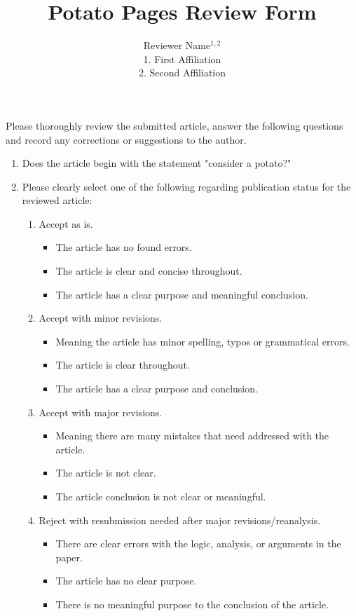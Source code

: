 \documentclass[10pt]{article}
\title{Potato Pages Review Form}
\author{Reviewer Name$^{1,2}$\\ \scriptsize{1. First Affiliation} \\ \scriptsize{2. Second Affiliation}}
\date{}
\begin{document}
\maketitle
\thispagestyle{fancy}

Please thoroughly review the submitted article, answer the following questions and record any corrections or suggestions to the author.

\begin{enumerate}
	\item Does the article begin with the statement "consider a potato?"
	\item Please clearly select one of the following regarding publication status for the reviewed article:
	\begin{enumerate}
		\item Accept as is.
		\begin{itemize}
			\item The article has no found errors.
			\item The article is clear and concise throughout.
			\item The article has a clear purpose and meaningful conclusion.
		\end{itemize}
		\item Accept with minor revisions.
		\begin{itemize}
			\item Meaning the article has minor spelling, typos or grammatical errors.
			\item The article is clear throughout.
			\item The article has a clear purpose and conclusion.
		\end{itemize}
		\item Accept with major revisions.
		\begin{itemize}
			\item Meaning there are many mistakes that need addressed with the article.
			\item The article is not clear.
			\item The article conclusion is not clear or meaningful.
		\end{itemize}
		\item Reject with resubmission needed after major revisions/reanalysis.
		\begin{itemize}
			\item There are clear errors with the logic, analysis, or arguments in the paper.
			\item The article has no clear purpose.
			\item There is no meaningful purpose to the conclusion of the article.

\end{itemize}
\end{enumerate}
\end{enumerate}
\end{document}
